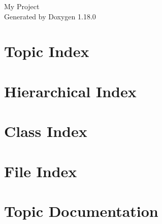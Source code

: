 \documentclass[twoside]{book}
\newcommand{\+}{\discretionary{\mbox{\scriptsize$\hookleftarrow$}}{}{}}
\newcommand{\clearemptydoublepage}{%
    \newpage{\pagestyle{empty}\cleardoublepage}%
  }
\begin{document}
  \raggedbottom
    \hypersetup{pageanchor=false,
                bookmarksnumbered=true,
                pdfencoding=unicode
               }
  \begin{titlepage}
  \vspace*{7cm}
  \begin{center}%
  {\Large My Project}\\
  \vspace*{1cm}
  {\large Generated by Doxygen 1.18.0}\\
  \end{center}
  \end{titlepage}
  \clearemptydoublepage
  \tableofcontents
  \clearemptydoublepage
  \hypersetup{pageanchor=true}


\chapter{Topic Index}

\chapter{Hierarchical Index}

\chapter{Class Index}

\chapter{File Index}

\chapter{Topic Documentation}


\end{document}
